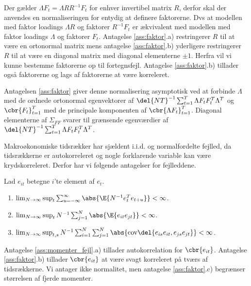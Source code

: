 %
Der gælder  \(\Lambda F_t = \Lambda R R^{-1} F_t\) for enhver invertibel matrix \(R\), derfor skal der anvendes en normaliseringen for entydig at definere faktorerne.
Dvs at modellen med faktor loadings \(\Lambda R\) og faktorer \(R^{-1} F_t\) er ækvivalent med modellen med faktor loadings \(\Lambda\) og faktorer \(F_t\).
Antagelse \ref{ass:faktor}.a) restringerer \(R\) til at være en ortonormal matrix mens antagelse \ref{ass:faktor}.b) yderligere restringerer \(R\) til at være en diagonal matrix med diagonal elementerne \(\pm 1\).
Herfra vil vi kunne bestemme faktorerne op til fortegnsfejl.
Antagelse \ref{ass:faktor}.b) tillader også faktorerne og lags af faktorerne at være korreleret.

Antagelsen \ref{ass:faktor} giver denne normalisering asymptotisk ved at forbinde \(\Lambda\) med de ordnede ortonormal egenvektorer af \(\del{NT}^{-1} \sum_{t=1}^T \Lambda F_t F_t^T \Lambda^T\) og \(\cbr{F_t}_{t=1}^T\) med de principale komponenten af \(\cbr{\Lambda F_t}_{t=1}^T\).
Diagonal elementerne af \(\Sigma_{FF}\) svarer til grænsende egenværdier af \(\del{NT}^{-1} \sum_{t=1}^T \Lambda F_t F_t^T \Lambda^T\).

Makroøkonomiske tidsrækker har sjældent i.i.d. og normalfordelte fejlled, da tidsrækkerne er autokorreleret og nogle forklarende variable kan være krydskorreleret. 
Derfor har vi følgende antagelser for fejlleddene.
%
\begin{ass} \label{ass:momenter_fejl}
Lad \(e_{it}\) betegne \(i\)'te element af \(e_t\).
\begin{enumerate}[label=\alph*)]
\item \(\lim_{N \rightarrow \infty} \sup_t \sum_{u = - \infty}^\infty \abs{\E{N^{-1} e_t^T e_{t+u}}} < \infty\).
\item \(\lim_{N \rightarrow \infty} \sup_t N^{-1} \sum_{j = 1}^N \abs{\E{e_{it} e_{jt}}} < \infty\).
\item \(\lim_{N \rightarrow \infty} \sup_{t,s} N^{-1} \sum_{i=1}^N \sum_{j=1}^N \abs{\text{cov}\del{e_{is} e_{it}, e_{js} e_{jt}}} < \infty\).
\end{enumerate}
\end{ass}
%
Antagelse \ref{ass:momenter_fejl}.a) tillader autokorrelation for \(\cbr{e_{it}}\).
Antagelse \ref{ass:faktor}.b) tillader \(\cbr{e_{it}}\) at være svagt korreleret på tværs af tidsrækkerne.
Vi antager ikke normalitet, men antagelse \ref{ass:faktor}.c) begrænser størrelsen af fjerde momenter.

